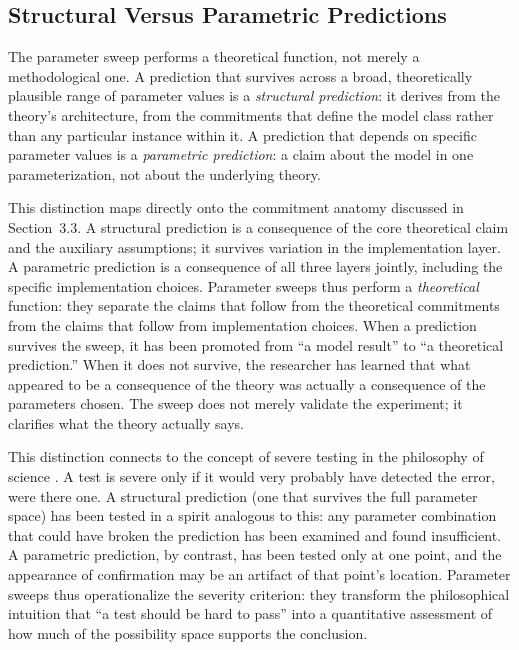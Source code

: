 \documentclass[fleqn,10pt]{wlscirep}
\begin{document}
\begin{linenumbers}
\subsection{Structural Versus Parametric Predictions}

The parameter sweep performs a theoretical function, not merely a methodological one. A prediction that survives across a broad, theoretically plausible range of parameter values is a \emph{structural prediction}: it derives from the theory's architecture, from the commitments that define the model class rather than any particular instance within it. A prediction that depends on specific parameter values is a \emph{parametric prediction}: a claim about the model in one parameterization, not about the underlying theory.

This distinction maps directly onto the commitment anatomy discussed in Section~3.3. A structural prediction is a consequence of the core theoretical claim and the auxiliary assumptions; it survives variation in the implementation layer. A parametric prediction is a consequence of all three layers jointly, including the specific implementation choices. Parameter sweeps thus perform a \emph{theoretical} function: they separate the claims that follow from the theoretical commitments from the claims that follow from implementation choices. When a prediction survives the sweep, it has been promoted from ``a model result'' to ``a theoretical prediction.'' When it does not survive, the researcher has learned that what appeared to be a consequence of the theory was actually a consequence of the parameters chosen. The sweep does not merely validate the experiment; it clarifies what the theory actually says.

This distinction connects to the concept of severe testing in the philosophy of science \citep{mayo1996error}. A test is severe only if it would very probably have detected the error, were there one. A structural prediction (one that survives the full parameter space) has been tested in a spirit analogous to this: any parameter combination that could have broken the prediction has been examined and found insufficient. A parametric prediction, by contrast, has been tested only at one point, and the appearance of confirmation may be an artifact of that point's location. Parameter sweeps thus operationalize the severity criterion: they transform the philosophical intuition that ``a test should be hard to pass'' into a quantitative assessment of how much of the possibility space supports the conclusion.


\end{linenumbers}
\end{document}

